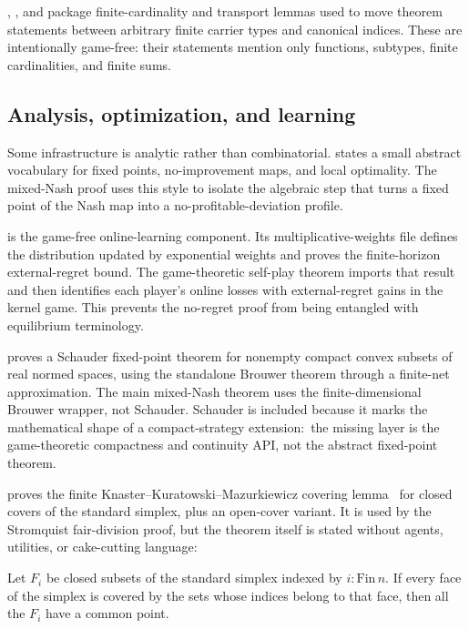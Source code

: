 , , and
 package finite-cardinality and
 transport lemmas used to move theorem statements between
arbitrary finite carrier types and canonical  indices.  These
are intentionally game-free: their statements mention only functions,
subtypes, finite cardinalities, and finite sums.

\subsection{Analysis, optimization, and learning}
\label{sec:math-layer:analysis}

Some infrastructure is analytic rather than combinatorial.
 states a small abstract vocabulary
for fixed points, no-improvement maps, and local optimality.  The
mixed-Nash proof uses this style to isolate the algebraic step that
turns a fixed point of the Nash map into a no-profitable-deviation
profile.

 is the game-free online-learning component.
Its multiplicative-weights file defines the distribution updated by
exponential weights and proves the finite-horizon external-regret
bound.  The game-theoretic self-play theorem imports that result and
then identifies each player's online losses with external-regret
gains in the kernel game.  This prevents the no-regret proof from
being entangled with equilibrium terminology.

 proves a Schauder fixed-point theorem
for nonempty compact convex subsets of real normed spaces, using the
standalone Brouwer theorem through a finite-net approximation.  The
main mixed-Nash theorem uses the finite-dimensional Brouwer wrapper,
not Schauder.  Schauder is included because it marks the mathematical
shape of a compact-strategy extension:\ the missing layer is the
game-theoretic compactness and continuity API, not the abstract
fixed-point theorem.

 proves the finite
Knaster--Kuratowski--Mazurkiewicz covering lemma~\citep{KKM1929} for
closed covers of the standard simplex, plus an open-cover variant.  It
is used by the Stromquist fair-division proof, but the theorem itself
is stated without agents, utilities, or cake-cutting language:

\begin{theorem}
\label{thm:kkm}
Let $F_i$ be closed subsets of the standard simplex indexed by
$i : \mathrm{Fin}\,n$.  If every face of the simplex is covered by the
sets whose indices belong to that face, then all the $F_i$ have a
common point.
\end{theorem}

